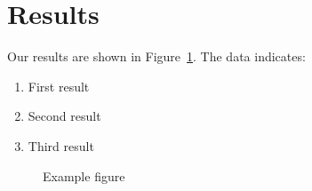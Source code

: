\section{Results}
\label{sec:results}

Our results are shown in Figure~\ref{fig:example}. The data indicates:
\begin{enumerate}
    \item First result
    \item Second result
    \item Third result
\end{enumerate}

\begin{figure}[h]
    \centering
    \caption{Example figure}
    \label{fig:example}
\end{figure}